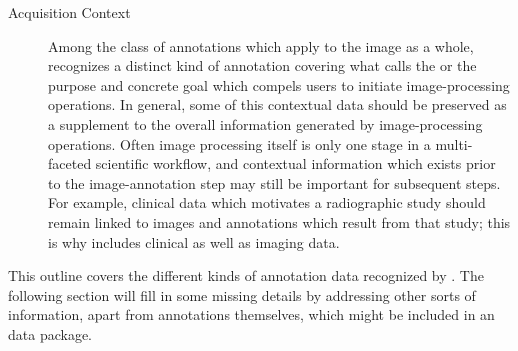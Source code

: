 {\begin{description}
\item[Acquisition Context]  Among the class of 
annotations which apply to the image as a whole, 
\AXFI{} recognizes a distinct kind of annotation 
covering what \AIM{} calls the  
or the purpose and concrete goal which compels 
users to initiate image-processing operations.  
In general, some of this contextual data 
should be preserved as a supplement to 
the overall information generated by image-processing 
operations.  Often image processing itself is only 
one stage in a multi-faceted scientific workflow, 
and contextual information which exists prior to 
the image-annotation step may still be important 
for subsequent steps.  For example, clinical data 
which motivates a radiographic study should remain 
linked to images and annotations which result from 
that study; this is why \DICOMSR{} includes 
clinical as well as imaging data.  
\end{description}

This outline covers the different kinds 
of annotation data recognized by \AXFI{}.  
The following section will fill in some 
missing details by addressing other 
sorts of information, apart from annotations 
themselves, which might be included in an 
\AXFI{} data package.}

